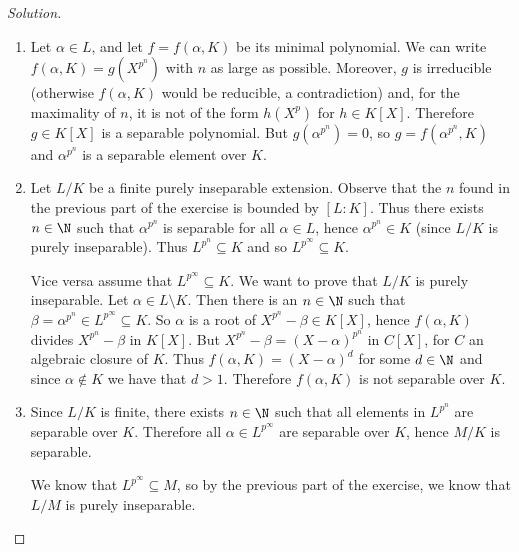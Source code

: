 \documentclass[a4paper,10pt,reqno]{amsart}
\newenvironment{sol}
  {\renewcommand\qedsymbol{$\blacksquare$}\begin{proof}[Solution]}
  {\end{proof}}
\begin{document}
\begin{sol}~

    \begin{enumerate}[label=(\roman*)]
        \item Let $\alpha\in L$, and let $f=f(\alpha,K)$ be its minimal polynomial.
        We can write $f(\alpha,K) = g(X^{p^n})$ with $n$ as large as possible.
        Moreover, $g$ is irreducible (otherwise $f(\alpha,K)$ would be reducible, a contradiction) and, for the maximality of $n$,
        it is not of the form $h(X^p)$ for $h\in K[X]$.
        Therefore $g\in K[X]$ is a separable polynomial.
        But $g(\alpha^{p^n})=0$, so $g=f(\alpha^{p^n},K)$
        and $\alpha^{p^n}$ is a separable element over $K$.
        \item Let $L/K$ be a finite purely inseparable extension.
        Observe that the $n$ found in the previous part of the exercise is bounded by $[L:K]$.
        Thus there exists $n\in \N$ such that 
        $\alpha^{p^n}$ is separable for all $\alpha\in L$, hence $\alpha^{p^n}\in K$ 
        (since $L/K$ is purely inseparable).
        Thus $L^{p^n}\subseteq K$ and so $L^{p^\infty}\subseteq K$.

        Vice versa assume that $L^{p^\infty}\subseteq K$.
        We want to prove that $L/K$ is purely inseparable.
        Let $\alpha\in L\setminus K$.
        Then there is an $n\in \N$ such that $\beta=\alpha^{p^n}\in L^{p^\infty}\subseteq K$.
        So $\alpha$ is a root of $X^{p^n}-\beta\in K[X]$,
        hence $f(\alpha,K)$ divides $X^{p^n}-\beta$ in $K[X]$.
        But $X^{p^n}-\beta=(X-\alpha)^{p^n}$ in $C[X]$, for $C$ an algebraic closure of $K$.
        Thus $f(\alpha,K)=(X-\alpha)^d$ for some $d\in \N$ and since $\alpha\notin K$ we have that $d>1$.
        Therefore $f(\alpha,K)$ is not separable over $K$.
        \item Since $L/K$ is finite,
        there exists $n\in\N$ such that 
        all elements in $L^{p^n}$ are separable over $K$.
        Therefore all $\alpha\in L^{p^\infty}$ are separable over $K$, hence $M/K$ is separable.

        We know that $L^{p^\infty}\subseteq M$, so by
        the previous part of the exercise,
        we know that $L/M$ is purely inseparable.\qedhere
    \end{enumerate}
\end{sol}
\end{document}
